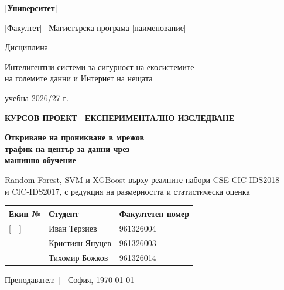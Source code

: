 \documentclass[11pt,a4paper,oneside]{report}
\begin{document}
\begin{titlepage}
\pagecolor{white}
\begin{center}
{\sffamily\color{white}
{\large\bfseries [Университет] \par}\vspace{2pt}
{\normalsize [Факултет] \textbullet\ Магистърска програма [наименование]\par}\vspace{14pt}
{\small Дисциплина\par}\vspace{2pt}
{\large Интелигентни системи за сигурност на екосистемите\\на големите данни и Интернет на нещата\par}\vspace{4pt}
{\small учебна 2026/27 г.\par}}
\vspace{3.4cm}

{\sffamily\small\color{accent}\bfseries КУРСОВ ПРОЕКТ \textbullet\ ЕКСПЕРИМЕНТАЛНО ИЗСЛЕДВАНЕ\par}\vspace{10pt}
{\sffamily\fontsize{22}{27}\selectfont\bfseries\color{navy}
Откриване на проникване в мрежов\\ трафик на център за данни чрез\\ машинно обучение\par}
\vspace{10pt}
{\large\color{muted} Random Forest, SVM и XGBoost върху реалните набори CSE-CIC-IDS2018\\ и CIC-IDS2017, с редукция на размерността и статистическа оценка\par}
\vspace{1.4cm}

\begin{tabular}{@{}p{4.2cm}p{4.2cm}p{3.6cm}@{}}
\toprule
\textsf{\textbf{Екип №}} & \textsf{\textbf{Студент}} & \textsf{\textbf{Факултетен номер}}\\
\midrule
{[\ \ ]} & Иван Терзиев & 961326004\\
    & Кристиян Януцев & 961326003\\
    & Тихомир Божков & 961326014\\
\bottomrule
\end{tabular}

\vfill
{\sffamily\small\color{muted} Преподавател: [ ] \hfill София, \today\par}
\end{center}
\restoregeometry
\end{titlepage}
\end{document}
